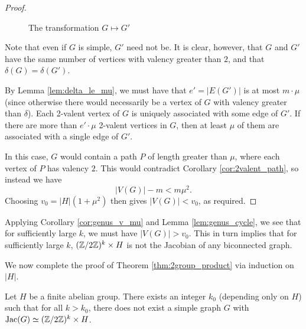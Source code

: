 \documentclass{amsart}
\begin{document}
\begin{proof}
\begin{figure}[H]
\begin{center}
\begin{tikzpicture}
      \end{tikzpicture}
      \caption{The transformation $G \mapsto G'$}
    \end{center}
  \end{figure}

  Note that even if $G$ is simple, $G'$ need not be. It is clear,
  however, that $G$ and $G'$ have the same number of vertices with
  valency greater than $2$, and that $\delta(G) = \delta(G')$.

  By Lemma \ref{lem:delta_le_mu}, we must have that $e' = |E(G')|$ is
  at most $m \cdot \mu$ (since otherwise there would necessarily be a
  vertex of $G$ with valency greater than $\delta$). Each 2-valent
  vertex of $G$ is uniquely associated with some edge of $G'$. If
  there are more than $e' \cdot \mu$ 2-valent vertices in $G$, then at
  least $\mu$ of them are associated with a single edge of $G'$.

  In this case, $G$ would contain a path $P$ of length greater than
  $\mu$, where each vertex of $P$ has valency $2$. This would
  contradict Corollary \ref{cor:2valent_path}, so instead we have
  \[
  |V(G)| - m < m\mu^2.
  \] 
  Choosing $v_0 = |H|(1 + \mu^2)$ then gives $|V(G)| < v_0$, as
  required.
\end{proof}

Applying Corollary \ref{cor:genus_v_mu} and Lemma
\ref{lem:genus_cycle}, we see that for sufficiently large $k$, we must
have $|V(G)| > v_0$. This in turn implies that for sufficiently large
$k$, $(\Z/2\Z)^k \times H$ is not the Jacobian of any biconnected
graph.

We now complete the proof of Theorem \ref{thm:2group_product} via
induction on $|H|$.

\begin{thm}
  \label{thm:2group_product}
  Let $H$ be a finite abelian group. There exists an integer $k_0$
  (depending only on $H$) such that for all $k > k_0$, there does not exist
  a simple graph $G$ with $\Jac(G) \simeq (\Z/2\Z)^k \times H$.
\end{thm}
  
\end{document}
